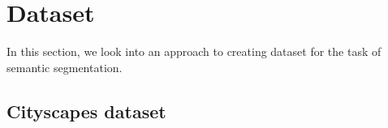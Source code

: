 

\section{Dataset}
\label{section:dataset}

In this section, we look into an approach to creating dataset for the task of semantic segmentation.

\subsection{Cityscapes dataset}


